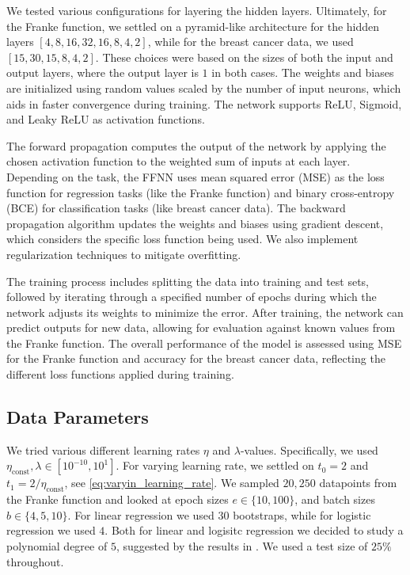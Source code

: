 \documentclass[%
reprint,s
amsmath,amssymb,
aps,
]{revtex4-2}
\begin{document}
We tested various configurations for layering the hidden layers. Ultimately, for the Franke function, we settled on a pyramid-like architecture for the hidden layers \([4,8,16,32,16,8,4,2]\), while for the breast cancer data, we used \([15,30,15,8,4,2]\). These choices were based on the sizes of both the input and output layers, where the output layer is \(1\) in both cases. The weights and biases are initialized using random values scaled by the number of input neurons, which aids in faster convergence during training. The network supports ReLU, Sigmoid, and Leaky ReLU as activation functions. 

The forward propagation computes the output of the network by applying the chosen activation function to the weighted sum of inputs at each layer. Depending on the task, the FFNN uses mean squared error (MSE) as the loss function for regression tasks (like the Franke function) and binary cross-entropy (BCE) for classification tasks (like breast cancer data). The backward propagation algorithm updates the weights and biases using gradient descent, which considers the specific loss function being used. We also implement regularization techniques to mitigate overfitting.

The training process includes splitting the data into training and test sets, followed by iterating through a specified number of epochs during which the network adjusts its weights to minimize the error. After training, the network can predict outputs for new data, allowing for evaluation against known values from the Franke function. The overall performance of the model is assessed using MSE for the Franke function and accuracy for the breast cancer data, reflecting the different loss functions applied during training.

\subsection{Data Parameters}
We tried various different learning rates \(\eta\) and \(\lambda\)-values. Specifically, we used \(\eta_{\text{const}}, \lambda \in[10^{-10}, 10^{1}]\). For varying learning rate, we settled on \(t_0=2\) and \(t_{1} = 2 / \eta_{\text{const}} \), see \eqref{eq:varyin_learning_rate}. We sampled \(20, 250\) datapoints from the Franke function and looked at epoch sizes \(e \in \{10, 100\}\), and batch sizes \(b\in\{4, 5, 10\}\). For linear regression we used \(30\) bootstraps, while for logistic regression we used \(4\). Both for linear and logisitc regression we decided to study a polynomial degree of \(5\), suggested by the results in \cite{project1}. We used a test size of \(25\%\) throughout. 
\end{document}
